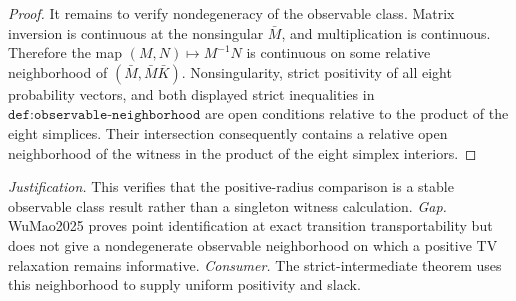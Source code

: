 \documentclass{article}
\begin{document}
\begin{proof}
It remains to verify nondegeneracy of the observable class.  Matrix inversion is continuous at the nonsingular \(\bar M\), and multiplication is continuous.  Therefore the map \((M,N)\mapsto M^{-1}N\) is continuous on some relative neighborhood of \((\bar M,\bar M\bar K)\).  Nonsingularity, strict positivity of all eight probability vectors, and both displayed strict inequalities in \(\texttt{def:observable-neighborhood}\) are open conditions relative to the product of the eight simplices.  Their intersection consequently contains a relative open neighborhood of the witness in the product of the eight simplex interiors.
\end{proof}
\par\smallskip\noindent \textit{Justification.} This verifies that the positive-radius comparison is a stable observable class result rather than a singleton witness calculation. \textit{Gap.} WuMao2025 proves point identification at exact transition transportability but does not give a nondegenerate observable neighborhood on which a positive TV relaxation remains informative. \textit{Consumer.} The strict-intermediate theorem uses this neighborhood to supply uniform positivity and slack.
\end{document}
